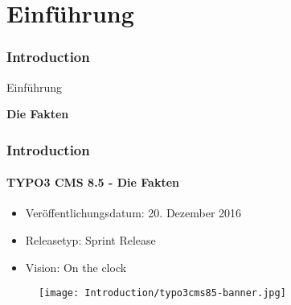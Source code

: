 %

\section{Einführung}
\begin{frame}[fragile]
	\frametitle{Introduction}

	\begin{center}\huge{Einführung}\end{center}
	\begin{center}\huge{\color{typo3darkgrey}\textbf{Die Fakten}}\end{center}

\end{frame}

\begin{frame}[fragile]
	\frametitle{Introduction}
	\framesubtitle{TYPO3 CMS 8.5 - Die Fakten}

	\begin{itemize}
		\item Veröffentlichungsdatum: 20. Dezember 2016
		\item Releasetyp: Sprint Release
		\item Vision: On the clock
	\end{itemize}

	\begin{figure}
		\texttt{[image: Introduction/typo3cms85-banner.jpg]}
	\end{figure}

\end{frame}

